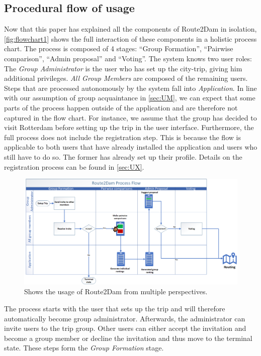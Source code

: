 \documentclass[11pt,a4paper,oneside]{article}
\begin{document}
\subsection{Procedural flow of usage}
Now that this paper has explained all the components of Route2Dam in isolation,
\autoref{fig:flowchart1} shows the full interaction of these components in a holistic process chart. The process is composed of 4 stages: “Group Formation”, “Pairwise comparison”, “Admin proposal” and “Voting”. The system knows two user roles: The \emph{Group Administrator} is the user who has set up the city-trip, giving him additional privileges. \emph{All Group Members} are composed of the remaining users. Steps that are processed autonomously by the system fall into \emph{Application}. In line with our assumption of group acquaintance in \autoref{sec:UM}, we can expect that some parts of the process happen outside of the application and are therefore not captured in the flow chart. For instance, we assume that the group has decided to visit Rotterdam before setting up the trip in the user interface. Furthermore, the full process does not include the registration step. This is because the flow is applicable to both users that have already installed the application  and users who still have to do so. The former has already set up their profile. Details on the registration process can be found in \autoref{sec:UX}.

\begin{figure}[H]
    \centering
    \includegraphics[width=1.1\linewidth]{paper/imgs/process_flow.png}
    \caption{Shows the usage of Route2Dam from multiple perspectives.}
    \label{fig:flowchart1}
\end{figure}

The process starts with the user that sets up the trip and will therefore automatically become group administrator. Afterwards, the administrator can invite users to the trip group. Other users can either accept the invitation and become a group member or decline the invitation and thus move to the terminal state. These steps form the \emph{Group Formation} stage. 
\end{document}
